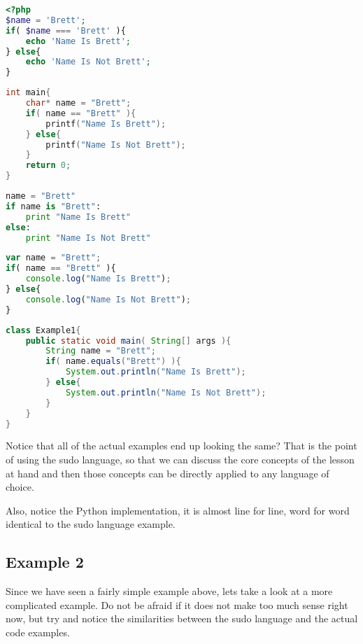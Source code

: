 \begin{lstlisting}[language=php,caption={Example 1 - PHP}]
<?php
$name = 'Brett';
if( $name === 'Brett' ){
    echo 'Name Is Brett';
} else{
    echo 'Name Is Not Brett';
}
\end{lstlisting}

\begin{lstlisting}[language=c,caption={Example 1 - C}]
int main{
    char* name = "Brett";
    if( name == "Brett" ){
        printf("Name Is Brett");
    } else{
        printf("Name Is Not Brett");
    }
    return 0;
}
\end{lstlisting}

\begin{lstlisting}[language=python,caption={Example 1 - Python}]
name = "Brett"
if name is "Brett":
    print "Name Is Brett"
else:
    print "Name Is Not Brett"
\end{lstlisting}

\begin{lstlisting}[language=javascript,caption={Example 1 - Node.JS}]
var name = "Brett";
if( name == "Brett" ){
    console.log("Name Is Brett");
} else{
    console.log("Name Is Not Brett");
}
\end{lstlisting}

\begin{lstlisting}[language=java,caption={Example 1 - Java}]
class Example1{
    public static void main( String[] args ){
        String name = "Brett";
        if( name.equals("Brett") ){
            System.out.println("Name Is Brett");
        } else{
            System.out.println("Name Is Not Brett");
        }
    }
}
\end{lstlisting}

Notice that all of the actual examples end up looking the same?
That is the point of using the sudo language, so that we can discuss the core concepts of the lesson
at hand and then those concepts can be directly applied to any language of choice.
\par

Also, notice the Python implementation, it is almost line for line, word for word identical to the sudo language example.

\subsection{Example 2}
Since we have seen a fairly simple example above, lets take a look at a more complicated example.
Do not be afraid if it does not make too much sense right now, but try and notice the similarities
between the sudo language and the actual code examples.



